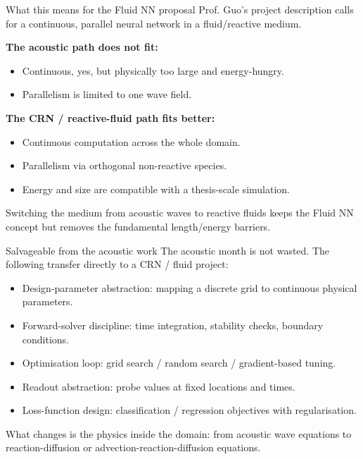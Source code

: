 \documentclass[aspectratio=169,11pt]{beamer}
\begin{document}
\begin{frame}{What this means for the Fluid NN proposal}
  \small
  Prof. Guo's project description calls for a continuous, parallel neural network in a fluid/reactive medium.

  \vspace{0.3cm}
  \textbf{The acoustic path does not fit:}
  \begin{itemize}
    \item Continuous, yes, but physically too large and energy-hungry.
    \item Parallelism is limited to one wave field.
  \end{itemize}

  \vspace{0.2cm}
  \textbf{The CRN / reactive-fluid path fits better:}
  \begin{itemize}
    \item Continuous computation across the whole domain.
    \item Parallelism via orthogonal non-reactive species.
    \item Energy and size are compatible with a thesis-scale simulation.
  \end{itemize}

  \vspace{0.2cm}
  Switching the medium from acoustic waves to reactive fluids keeps the Fluid NN concept but removes the fundamental length/energy barriers.
\end{frame}

\begin{frame}{Salvageable from the acoustic work}
  \small
  The acoustic month is not wasted. The following transfer directly to a CRN / fluid project:
  \begin{itemize}
    \item Design-parameter abstraction: mapping a discrete grid to continuous physical parameters.
    \item Forward-solver discipline: time integration, stability checks, boundary conditions.
    \item Optimisation loop: grid search / random search / gradient-based tuning.
    \item Readout abstraction: probe values at fixed locations and times.
    \item Loss-function design: classification / regression objectives with regularisation.
  \end{itemize}

  \vspace{0.3cm}
  What changes is the physics inside the domain: from acoustic wave equations to reaction-diffusion or advection-reaction-diffusion equations.
\end{frame}
\end{document}
